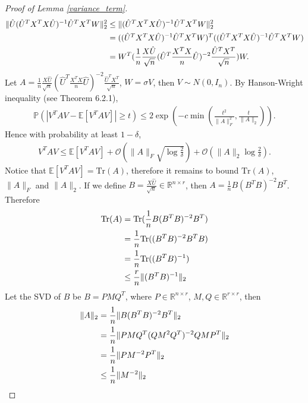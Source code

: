 \begin{proof}[Proof of Lemma \ref{variance_term}]
\begin{align}
\|\hat{U}(\hat{U}^{T}X^{T}X\hat{U})^{-1}\hat{U}^{T}X^{T} W\|_{2}^{2} &\leq \|(\hat{U}^{T}X^{T}X\hat{U})^{-1}\hat{U}^{T}X^{T} W\|_{2}^{2} \notag \\
&=((\hat{U}^{T}X^{T}X\hat{U})^{-1}\hat{U}^{T}X^{T} W)^{T}((\hat{U}^{T}X^{T}X\hat{U})^{-1}\hat{U}^{T}X^{T} W) \notag \\
&=W^{T} (\frac{1}{n}\frac{X\hat{U}}{\sqrt{n}} (\hat{U}^{T}\frac{X^{T}X}{n}\hat{U} )^{-2}\frac{\hat{U}^{T}X^{T}}{\sqrt{n}})W.
\end{align}
Let $A=\frac{1}{n}\frac{X\hat{U}}{\sqrt{n}} (\hat{U}^{T}\frac{X^{T}X}{n}\hat{U} )^{-2}\frac{\hat{U}^{T}X^{T}}{\sqrt{n}}$, $W=\sigma V$, then $V \sim N(0,I_{n})$. By Hanson-Wright inequality (see \citet{vershynin2018high} Theorem 6.2.1), 
\begin{align}
\mathbb{P}(|V^{T}AV-\mathbb{E}[V^{T}AV]| \geq t) \leq 2 \exp (-c \min(\frac{t^{2}}{\|A\|_{F}^{2}},\frac{t}{\|A\|_{2}})).   
\end{align}
Hence with probability at least $1-\delta$,
\begin{align}
V^{T}AV \leq \mathbb{E}[V^{T}AV] + \mathcal{O}(\|A\|_{F}\sqrt{\log\frac{2}{\delta}})  + \mathcal{O}(\|A\|_{2}\log\frac{2}{\delta}).
\end{align}
Notice that $\mathbb{E}[V^{T}AV]=\text{Tr}(A)$, therefore it remains to bound $\text{Tr}(A)$, $\|A\|_{F}$ and $\|A\|_{2}$. If we define $B=\frac{X\hat{U}}{\sqrt{n}} \in \mathbb{R}^{n \times r}$, then $A=\frac{1}{n}B(B^{T}B)^{-2}B^{T}$. Therefore 
\begin{align}
\text{Tr}(A) &= \text{Tr}(\frac{1}{n}B(B^{T}B)^{-2}B^{T}) \notag \\   
&= \frac{1}{n}\text{Tr}((B^{T}B)^{-2}B^{T}B) \notag \\
&= \frac{1}{n}\text{Tr}((B^{T}B)^{-1}) \notag \\
& \leq \frac{r}{n} \|(B^{T}B)^{-1}\|_{2}
\end{align}
Let the SVD of $B$ be $B=PMQ^{T}$, where $P \in \mathbb{R}^{n \times r}$, $M,Q \in \mathbb{R}^{r \times r}$, then
\begin{align}
\|A\|_{2} &=   \frac{1}{n} \|B(B^{T}B)^{-2}B^{T}\|_{2} \notag \\  
&=   \frac{1}{n} \|PMQ^{T}(QM^{2}Q^{T})^{-2}QMP^{T}\|_{2} \notag \\ 
&=   \frac{1}{n} \|PM^{-2}P^{T}\|_{2} \notag \\ 
& \leq \frac{1}{n}  \|M^{-2}\|_{2} \notag \\

\end{align}
\end{proof}
